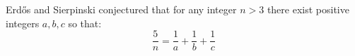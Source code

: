 \documentclass[12pt]{article}
\begin{document}
Erd\H{o}s and Sierpinski conjectured that for any integer $ n>3 $ there exist 
positive integers $a,b,c $ so that:
$$ \frac{5}{n} = \frac{1}{a} + \frac{1}{b} + \frac{1}{c} $$
\end{document}
